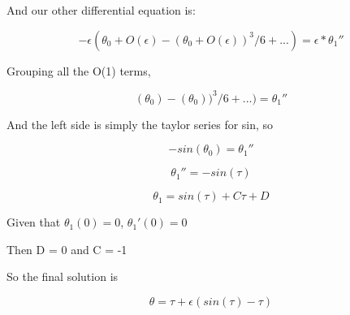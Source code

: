 \documentclass{article}
\begin{document}
And our other differential equation is:

$$-\epsilon(\theta_0 + O(\epsilon) - (\theta_0 + O(\epsilon) )^3/6 + ... ) = \epsilon*\theta_1 ''$$

Grouping all the O(1) terms, 

$$(\theta_0) - (\theta_0) )^3/6 + ... ) = \theta_1 ''$$

And the left side is simply the taylor series for sin, so

$$-sin(\theta_0) = \theta_1 ''$$

$$\theta_1 '' = -sin(\tau)$$

$$\theta_1 = sin(\tau)+C\tau+D$$

Given that  $\theta_1(0) = 0$, $\theta_1'(0) = 0$

Then D = 0 and C = -1 

So the final solution is 

$$\theta = \tau + \epsilon(sin(\tau)-\tau)$$







  
\end{document}
